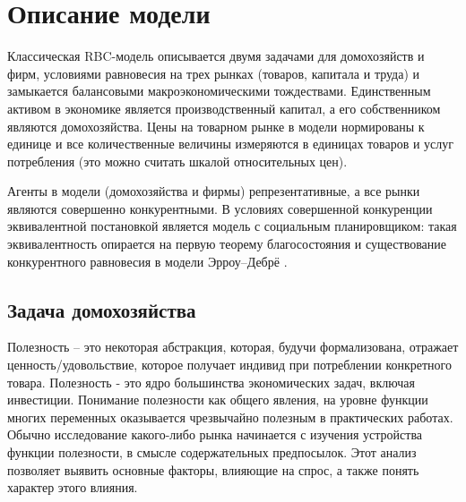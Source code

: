 \chapter{Описание модели}

Классическая RBC-модель описывается двумя задачами для домохозяйств и фирм,
условиями равновесия на трех рынках (товаров, капитала и труда) и замыкается
балансовыми макроэкономическими тождествами. Единственным активом в экономике
является производственный капитал, а его собственником являются домохозяйства. Цены
на товарном рынке в модели нормированы к единице и все количественные величины
измеряются в единицах товаров и услуг потребления (это можно считать шкалой
относительных цен).


Агенты в модели (домохозяйства и фирмы) репрезентативные, а все рынки являются
совершенно конкурентными. В условиях совершенной конкуренции эквивалентной
постановкой является модель с социальным планировщиком: такая эквивалентность
опирается на первую теорему благосостояния и существование конкурентного
равновесия в модели Эрроу--Дебрё \cite{arrowdebreu1954existence}.


\section{Задача домохозяйства}
Полезность – это некоторая абстракция, которая, будучи формализована, отражает ценность/удовольствие, которое получает индивид при потреблении конкретного товара. Полезность - это ядро большинства экономических задач, включая инвестиции.
Понимание полезности как общего явления, на уровне функции многих переменных оказывается чрезвычайно полезным в практических работах. Обычно исследование какого-либо рынка начинается с изучения устройства функции полезности, в смысле содержательных предпосылок. Этот анализ позволяет выявить основные факторы, влияющие на спрос, а также понять характер этого влияния.

